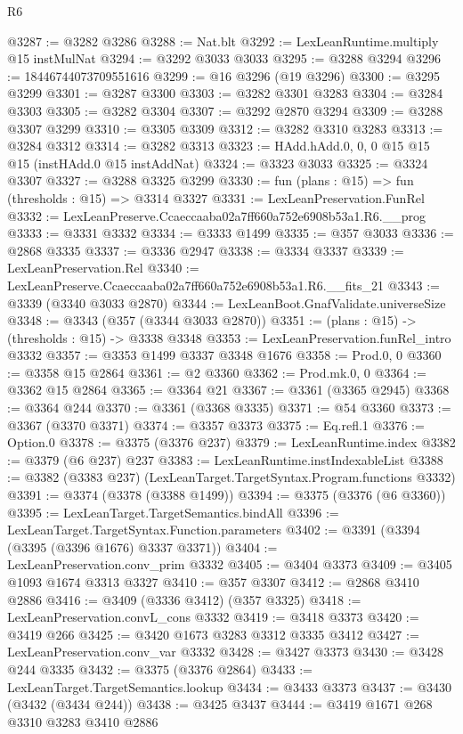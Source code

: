 \begin{lexlean}{R6}
\begin{coremodule}
{{{{{{{{{{{{{{{{{{{@3287 := @3282 @3286
@3288 := Nat.blt
@3292 := LexLeanRuntime.multiply @15 instMulNat
@3294 := @3292 @3033 @3033
@3295 := @3288 @3294
@3296 := 18446744073709551616
@3299 := @16 @3296 (@19 @3296)
@3300 := @3295 @3299
@3301 := @3287 @3300
@3303 := @3282 @3301 @3283
@3304 := @3284 @3303
@3305 := @3282 @3304
@3307 := @3292 @2870 @3294
@3309 := @3288 @3307 @3299
@3310 := @3305 @3309
@3312 := @3282 @3310 @3283
@3313 := @3284 @3312
@3314 := @3282 @3313
@3323 := HAdd.hAdd.{0, 0, 0} @15 @15 @15 (instHAdd.{0} @15 instAddNat)
@3324 := @3323 @3033
@3325 := @3324 @3307
@3327 := @3288 @3325 @3299
@3330 := fun (plans : @15) => fun (thresholds : @15) => @3314 @3327
@3331 := LexLeanPreservation.FunRel
@3332 := LexLeanPreserve.Ccaeccaaba02a7ff660a752e6908b53a1.R6.__prog
@3333 := @3331 @3332
@3334 := @3333 @1499
@3335 := @357 @3033
@3336 := @2868 @3335
@3337 := @3336 @2947
@3338 := @3334 @3337
@3339 := LexLeanPreservation.Rel
@3340 := LexLeanPreserve.Ccaeccaaba02a7ff660a752e6908b53a1.R6.__fits_21
@3343 := @3339 (@3340 @3033 @2870)
@3344 := LexLeanBoot.GnafValidate.universeSize
@3348 := @3343 (@357 (@3344 @3033 @2870))
@3351 := (plans : @15) -> (thresholds : @15) -> @3338 @3348
@3353 := LexLeanPreservation.funRel_intro @3332
@3357 := @3353 @1499 @3337 @3348 @1676
@3358 := Prod.{0, 0}
@3360 := @3358 @15 @2864
@3361 := @2 @3360
@3362 := Prod.mk.{0, 0}
@3364 := @3362 @15 @2864
@3365 := @3364 @21
@3367 := @3361 (@3365 @2945)
@3368 := @3364 @244
@3370 := @3361 (@3368 @3335)
@3371 := @54 @3360
@3373 := @3367 (@3370 @3371)
@3374 := @3357 @3373
@3375 := Eq.refl.{1}
@3376 := Option.{0}
@3378 := @3375 (@3376 @237)
@3379 := LexLeanRuntime.index
@3382 := @3379 (@6 @237) @237
@3383 := LexLeanRuntime.instIndexableList
@3388 := @3382 (@3383 @237) (LexLeanTarget.TargetSyntax.Program.functions @3332)
@3391 := @3374 (@3378 (@3388 @1499))
@3394 := @3375 (@3376 (@6 @3360))
@3395 := LexLeanTarget.TargetSemantics.bindAll
@3396 := LexLeanTarget.TargetSyntax.Function.parameters
@3402 := @3391 (@3394 (@3395 (@3396 @1676) @3337 @3371))
@3404 := LexLeanPreservation.conv_prim @3332
@3405 := @3404 @3373
@3409 := @3405 @1093 @1674 @3313 @3327
@3410 := @357 @3307
@3412 := @2868 @3410 @2886
@3416 := @3409 (@3336 @3412) (@357 @3325)
@3418 := LexLeanPreservation.convL_cons @3332
@3419 := @3418 @3373
@3420 := @3419 @266
@3425 := @3420 @1673 @3283 @3312 @3335 @3412
@3427 := LexLeanPreservation.conv_var @3332
@3428 := @3427 @3373
@3430 := @3428 @244 @3335
@3432 := @3375 (@3376 @2864)
@3433 := LexLeanTarget.TargetSemantics.lookup
@3434 := @3433 @3373
@3437 := @3430 (@3432 (@3434 @244))
@3438 := @3425 @3437
@3444 := @3419 @1671 @268 @3310 @3283 @3410 @2886
}}}}}}}}}}}}}}}}}}}
\end{coremodule}
\end{lexlean}
